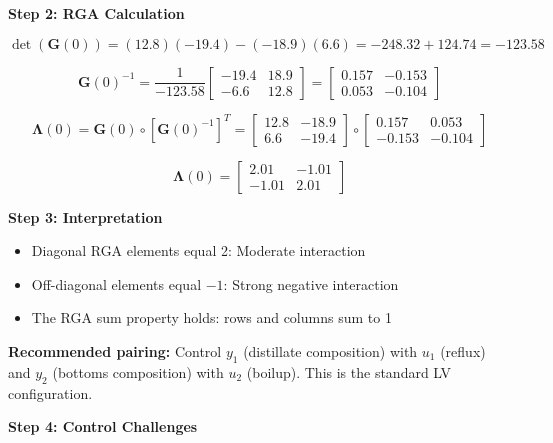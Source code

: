 \textbf{Step 2: RGA Calculation}

\begin{equation}
\det(\mathbf{G}(0)) = (12.8)(-19.4) - (-18.9)(6.6) = -248.32 + 124.74 = -123.58
\end{equation}

\begin{equation}
\mathbf{G}(0)^{-1} = \frac{1}{-123.58}\begin{bmatrix} -19.4 & 18.9 \\ -6.6 & 12.8 \end{bmatrix} = \begin{bmatrix} 0.157 & -0.153 \\ 0.053 & -0.104 \end{bmatrix}
\end{equation}

\begin{equation}
\boldsymbol{\Lambda}(0) = \mathbf{G}(0) \circ [\mathbf{G}(0)^{-1}]^T = \begin{bmatrix} 12.8 & -18.9 \\ 6.6 & -19.4 \end{bmatrix} \circ \begin{bmatrix} 0.157 & 0.053 \\ -0.153 & -0.104 \end{bmatrix}
\end{equation}

\begin{equation}
\boldsymbol{\Lambda}(0) = \begin{bmatrix} 2.01 & -1.01 \\ -1.01 & 2.01 \end{bmatrix}
\end{equation}

\textbf{Step 3: Interpretation}

\begin{itemize}
\item Diagonal RGA elements equal 2: Moderate interaction
\item Off-diagonal elements equal $-1$: Strong negative interaction
\item The RGA sum property holds: rows and columns sum to 1
\end{itemize}

\textbf{Recommended pairing:} Control $y_1$ (distillate composition) with $u_1$ (reflux) and $y_2$ (bottoms composition) with $u_2$ (boilup). This is the standard LV configuration.

\textbf{Step 4: Control Challenges}

